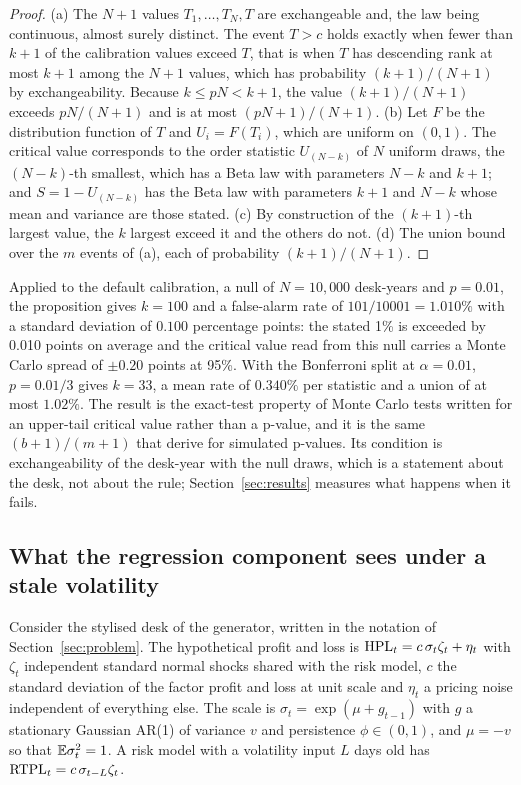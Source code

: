 \begin{proof}
(a) The $N+1$ values $T_1,\dots,T_N,T$ are exchangeable and, the law being continuous, almost surely distinct.
The event $T>c$ holds exactly when fewer than $k+1$ of the calibration values exceed $T$, that is when $T$ has descending rank at most $k+1$ among the $N+1$ values, which has probability $(k+1)/(N+1)$ by exchangeability.
Because $k\le pN<k+1$, the value $(k+1)/(N+1)$ exceeds $pN/(N+1)$ and is at most $(pN+1)/(N+1)$.
(b) Let $F$ be the distribution function of $T$ and $U_i=F(T_i)$, which are uniform on $(0,1)$.
The critical value corresponds to the order statistic $U_{(N-k)}$ of $N$ uniform draws, the $(N-k)$-th smallest, which has a Beta law with parameters $N-k$ and $k+1$; and $S=1-U_{(N-k)}$ has the Beta law with parameters $k+1$ and $N-k$ whose mean and variance are those stated.
(c) By construction of the $(k+1)$-th largest value, the $k$ largest exceed it and the others do not.
(d) The union bound over the $m$ events of (a), each of probability $(k+1)/(N+1)$.
\end{proof}

Applied to the default calibration, a null of $N=10{,}000$ desk-years and $p=0.01$, the proposition gives $k=100$ and a false-alarm rate of $101/10001=1.010\%$ with a standard deviation of $0.100$ percentage points: the stated 1\% is exceeded by 0.010 points on average and the critical value read from this null carries a Monte Carlo spread of $\pm0.20$ points at 95\%.
With the Bonferroni split at $\alpha=0.01$, $p=0.01/3$ gives $k=33$, a mean rate of $0.340\%$ per statistic and a union of at most $1.02\%$.
The result is the exact-test property of Monte Carlo tests \citep{dufour2006} written for an upper-tail critical value rather than a p-value, and it is the same $(b+1)/(m+1)$ that \citet{phipson2010} derive for simulated p-values.
Its condition is exchangeability of the desk-year with the null draws, which is a statement about the desk, not about the rule; Section~\ref{sec:results} measures what happens when it fails.

\subsection{What the regression component sees under a stale volatility}
\label{sec:theory-slope}

Consider the stylised desk of the generator, written in the notation of Section~\ref{sec:problem}.
The hypothetical profit and loss is $\mathrm{HPL}_t=c\,\sigma_t\zeta_t+\eta_t$ with $\zeta_t$ independent standard normal shocks shared with the risk model, $c$ the standard deviation of the factor profit and loss at unit scale and $\eta_t$ a pricing noise independent of everything else.
The scale is $\sigma_t=\exp(\mu+g_{t-1})$ with $g$ a stationary Gaussian AR(1) of variance $v$ and persistence $\phi\in(0,1)$, and $\mu=-v$ so that $\mathbb{E}\sigma_t^2=1$.
A risk model with a volatility input $L$ days old has $\mathrm{RTPL}_t=c\,\sigma_{t-L}\zeta_t$.

